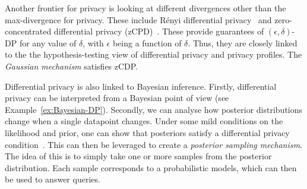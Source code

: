 Another frontier for privacy is looking at different divergences other than the max-divergence for privacy. These include R\'{e}nyi differential privacy~\citep{renyi-dp} and zero-concentrated differential privacy (zCPD)~\citep{zc-dp}. These provide guarantees of $(\epsilon, \delta)$-DP for any value of $\delta$, with $\epsilon$ being a function of $\delta$.  Thus, they are closely linked to the the hypothesis-testing view of differential privacy and privacy profiles. The \emph{Gaussian mechanism} satisfies zCDP.

Differential privacy is also linked to Bayesian inference. Firstly, differential privacy can be interpreted from a Bayesian point of view (see Example~\ref{ex:Bayesian-DP}). Secondly, we can analyse how posterior distributions change when a single datapoint changes. Under some mild conditions on the likelihood and prior, one can show that posteriors satisfy a differential privacy condition~\citep{bayesiandp}. This can then be leveraged to create a \emph{posterior sampling mechanism}. The idea of this is to simply take one or more samples from the posterior distribution. Each sample corresponds to a probabilistic models, which can then be used to answer queries. 

